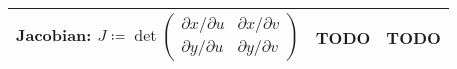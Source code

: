 \begin{tabular}{|m{.31\linewidth}|m{.31\linewidth}|m{.31\linewidth}|}
\hline

\textbf{Jacobian}:
    {$%
        J \coloneqq \det \left(
            \begin{array}{cc}
                \partial x/\partial u &
                \partial x/\partial v \\
                \partial y/\partial u &
                \partial y/\partial v
            \end{array}
        \right)%
    $} &

\textbf{TODO} &

\textbf{TODO} \\

\hline
\end{tabular}


